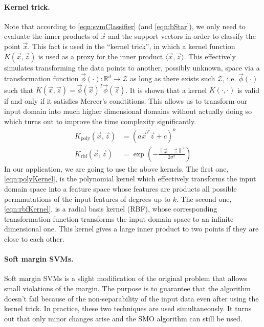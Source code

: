 \paragraph{Kernel trick.}
	Note that according to \eqref{eqn:svmClassifier} (and \eqref{eqn:bStar}), we only need to evaluate the inner products of $\vec x$ and the support vectors in order to classify the point $\vec x$. This fact is used in the ``kernel trick'', in which a kernel function $K(\vec x, \vec z)$ is used as a proxy for the inner product $\langle \vec x, \vec z \rangle$. This effectively simulates transforming the data points to another, possibly unknown, space via a transformation function $\vec\phi (\cdot): \mathbb{R}^d \to \mathcal{Z}$ as long as there exists such $\mathcal{Z}$, i.e. $\vec\phi (\cdot)$ such that $K(\vec x, \vec z) = \vec\phi (\vec x)^T \vec\phi (\vec z)$. It is shown that a kernel $K(\cdot, \cdot)$ is valid if and only if it satisfies Mercer's condtitions. This allows us to transform our input domain into much higher dimensional domains without actually doing so which turns out to improve the time complexity significantly.
	\begin{align}
		K_\text{poly}(\vec x, \vec z) & = \left( a \vec x^T \vec z  + c \right)^k \label{eqn:polyKernel} \\
		K_\text{rbf}(\vec x, \vec z) & = \exp{\left( - \frac{\left\| \vec x - \vec z \right\|^2}{2\sigma^2} \right)} \label{eqn:rbfKernel}
	\end{align}
In our application, we are going to use the above kernels. The first one, \eqref{eqn:polyKernel}, is the polynomial kernel which effectively transforms the input domain space into a feature space whose features are products all possible permmutations of the input features of degrees up to $k$. The second one, \eqref{eqn:rbfKernel}, is a radial basis kernel (RBF), whose corresponding transformation function transforms the input domain space to an infinite dimensional one. This kernel gives a large inner product to two points if they are close to each other.

\paragraph{Soft margin SVMs.}
	Soft margin SVMs is a slight modification of the original problem that allows small violations of the margin. The purpose is to guarantee that the algorithm doesn't fail because of the non-separability of the input data even after using the kernel trick. In practice, these two techniques are used simultaneously. It turns out that only minor changes arise and the SMO algorithm can still be used.
	
